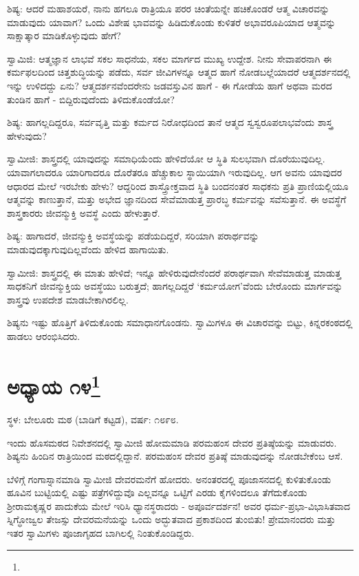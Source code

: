 ಶಿಷ್ಯ: ಆದರೆ ಮಹಾಶಯರೆ, ನಾನು ಹಗಲೂ ರಾತ್ರಿಯೂ ಪರರ ಚಿಂತೆಯನ್ನೇ ಹಚಿಕೊಂಡರೆ ಆತ್ಮ ವಿಚಾರವನ್ನು ಮಾಡುವುದು ಯಾವಾಗ? ಒಂದು ವಿಶೇಷ ಭಾವವನ್ನು ಹಿಡಿದುಕೊಂಡು ಕುಳಿತರೆ ಅಭಾವರೂಪಿಯಾದ ಆತ್ಮವನ್ನು ಸಾಕ್ಷಾತ್ಕಾರ ಮಾಡಿಕೊಳ್ಳುವುದು ಹೇಗೆ?

ಸ್ವಾಮಿಜಿ: ಆತ್ಮಜ್ಞಾನ ಲಾಭವೆ ಸಕಲ ಸಾಧನೆಯ, ಸಕಲ ಮಾರ್ಗದ ಮುಖ್ಯ ಉದ್ದೇಶ. ನೀನು ಸೇವಾಪರನಾಗಿ ಈ ಕರ್ಮಫಲದಿಂದ ಚಿತ್ತಶುದ್ಧಿಯನ್ನು ಪಡೆದು, ಸರ್ವ ಜೀವಿಗಳನ್ನೂ ಆತ್ಮದ ಹಾಗೆ ನೋಡಬಲ್ಲೆಯಾದರೆ ಆತ್ಮದರ್ಶನದಲ್ಲಿ ಇನ್ನು ಉಳಿದದ್ದು ಏನು? ಆತ್ಮದರ್ಶನವೆಂದರೇನು ಜಡವಸ್ತುವಿನ ಹಾಗೆ - ಈ ಗೋಡೆಯ ಹಾಗೆ ಅಥವಾ ಮರದ ತುಂಡಿನ ಹಾಗೆ - ಬಿದ್ದಿರುವುದೆಂದು ತಿಳಿದುಕೊಂಡೆಯೋ?

ಶಿಷ್ಯ: ಹಾಗಲ್ಲದಿದ್ದರೂ, ಸರ್ವವೃತ್ತಿ ಮತ್ತು ಕರ್ಮದ ನಿರೋಧದಿಂದ ತಾನೆ ಆತ್ಮದ ಸ್ವಸ್ವರೂಪಲಾಭವೆಂದು ಶಾಸ್ತ್ರ ಹೇಳುವುದು?

ಸ್ವಾಮೀಜಿ: ಶಾಸ್ತ್ರದಲ್ಲಿ ಯಾವುದನ್ನು ಸಮಾಧಿಯೆಂದು ಹೇಳಿದೆಯೋ ಆ ಸ್ಥಿತಿ ಸುಲಭವಾಗಿ ದೊರೆಯುವುದಿಲ್ಲ. ಯಾವಾಗಲಾದರೂ ಯಾರಿಗಾದರೂ ದೊರೆತರೂ ಹೆಚ್ಚುಕಾಲ ಸ್ಥಾಯಿಯಾಗಿ ಇರುವುದಿಲ್ಲ. ಆಗ ಅವನು ಯಾವುದರ ಆಧಾರದ ಮೇಲೆ ಇರಬೇಕು ಹೇಳು? ಆದ್ದರಿಂದ ಶಾಸ್ತ್ರೋಕ್ತವಾದ ಸ್ಥಿತಿ ಬಂದನಂತರ ಸಾಧಕನು ಪ್ರತಿ ಪ್ರಾಣಿಯಲ್ಲಿಯೂ ಆತ್ಮವನ್ನು ಕಾಣುತ್ತಾನೆ, ಮತ್ತು ಅಭೇದ ಜ್ಞಾನದಿಂದ ಸೇವೆಮಾಡುತ್ತ ಪ್ರಾರಬ್ಧ ಕರ್ಮವನ್ನು ಸವೆಸುತ್ತಾನೆ. ಈ ಅವಸ್ಥೆಗೆ ಶಾಸ್ತ್ರಕಾರರು ಜೀವನ್ಮುಕ್ತಿ ಅವಸ್ಥೆ ಎಂದು ಹೇಳುತ್ತಾರೆ.

ಶಿಷ್ಯ: ಹಾಗಾದರೆ, ಜೀವನ್ಮುಕ್ತಿ ಅವಸ್ಥೆಯನ್ನು ಪಡೆಯದಿದ್ದರೆ, ಸರಿಯಾಗಿ ಪರಾರ್ಥವನ್ನು ಮಾಡುವುದಕ್ಕಾಗುವುದಿಲ್ಲವೆಂದು ಹೇಳಿದ ಹಾಗಾಯಿತು.

ಸ್ವಾಮೀಜಿ: ಶಾಸ್ತ್ರದಲ್ಲಿ ಈ ಮಾತು ಹೇಳಿದೆ; ಇನ್ನೂ ಹೇಳಿರುವುದೇನೆಂದರೆ ಪರಾರ್ಥವಾಗಿ ಸೇವೆಮಾಡುತ್ತ ಮಾಡುತ್ತ ಸಾಧಕನಿಗೆ ಜೀವನ್ಮುಕ್ತಿಯ ಅವಸ್ಥೆಯು ಬರುತ್ತದೆ; ಹಾಗಲ್ಲದಿದ್ದರೆ ‘ಕರ್ಮಯೋಗ’ವೆಂದು ಬೇರೊಂದು ಮಾರ್ಗವನ್ನು ಶಾಸ್ತ್ರವು ಉಪದೇಶ ಮಾಡಬೇಕಾಗಿರಲಿಲ್ಲ.

ಶಿಷ್ಯನು ಇಷ್ಟು ಹೊತ್ತಿಗೆ ತಿಳಿದುಕೊಂಡು ಸಮಾಧಾನಗೊಂಡನು. ಸ್ವಾಮಿಗಳೂ ಈ ವಿಚಾರವನ್ನು ಬಿಟ್ಟು, ಕಿನ್ನರಕಂಠದಲ್ಲಿ ಹಾಡಲು ಆರಂಭಿಸಿದರು.

\newpage

\chapter[ಅಧ್ಯಾಯ ೧೪]{ಅಧ್ಯಾಯ ೧೪\protect\footnote{}}

\centerline{ಸ್ಥಳ: ಬೇಲೂರು ಮಠ (ಬಾಡಿಗೆ ಕಟ್ಟಡ), ವರ್ಷ: ೧೮೯೮.}

ಇಂದು ಹೊಸಮಠದ ನಿವೇಶನದಲ್ಲಿ ಸ್ವಾಮೀಜಿ ಹೋಮಮಾಡಿ ಪರಮಹಂಸ ದೇವರ ಪ್ರತಿಷ್ಠೆಯನ್ನು ಮಾಡುವರು. ಶಿಷ್ಯನು ಹಿಂದಿನ ರಾತ್ರಿಯಿಂದ ಮಠದಲ್ಲಿದ್ದಾನೆ. ಪರಮಹಂಸ ದೇವರ ಪ್ರತಿಷ್ಠೆ ಮಾಡುವುದನ್ನು ನೋಡಬೇಕೆಂಬ ಆಸೆ.

ಬೆಳಿಗ್ಗೆ ಗಂಗಾಸ್ನಾನಮಾಡಿ ಸ್ವಾಮೀಜಿ ದೇವರಮನೆಗೆ ಹೋದರು. ಅನಂತರದಲ್ಲಿ ಪೂಜಾಸನದಲ್ಲಿ ಕುಳಿತುಕೊಂಡು ಹೂವಿನ ಬುಟ್ಟಿಯಲ್ಲಿ ಎಷ್ಟು ಪತ್ರೆಗಳಿದ್ದುವೊ ಎಲ್ಲವನ್ನೂ ಒಟ್ಟಿಗೆ ಎರಡು ಕೈಗಳಿಂದಲೂ ತೆಗೆದುಕೊಂಡು ಶ‍್ರೀರಾಮಕೃಷ್ಣರ ಪಾದುಕೆಯ ಮೇಲೆ ಇರಿಸಿ ಧ್ಯಾನಸ್ಥರಾದರು - ಅಪೂರ್ವದರ್ಶನ! ಅವರ ಧರ್ಮ-ಪ್ರಭಾ-ವಿಭಾಸಿತವಾದ ಸ್ನಿಗ್ಧೋಜ್ವಲ ತೇಜಸ್ಸು ದೇವರಮನೆಯನ್ನು ಒಂದು ಅದ್ಭುತವಾದ ಪ್ರಕಾಶದಿಂದ ತುಂಬಿತು! ಪ್ರೇಮಾನಂದರು ಮತ್ತು ಇತರ ಸ್ವಾಮಿಗಳು ಪೂಜಾಗೃಹದ ಬಾಗಿಲಲ್ಲಿ ನಿಂತುಕೊಂಡಿದ್ದರು.

